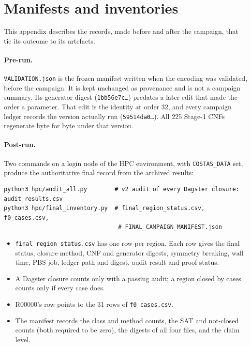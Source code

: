 \documentclass[11pt,a4paper]{article}
\theoremstyle{definition}
\newcommand{\code}[1]{\texttt{#1}}
\begin{document}
\section{Manifests and inventories}\label{app:manifests}
This appendix describes the records, made before and after the campaign, that tie its outcome to its artefacts.


\paragraph{Pre-run.} \code{VALIDATION.json} is the frozen manifest written when the encoding was
validated, before the campaign. It is kept unchanged as provenance and is not a campaign summary.
Its generator digest (\code{1bb56e7c\ldots}) predates a later edit that made the order a
parameter. That edit is the identity at order 32, and every campaign ledger records the version
actually run (\code{59514da0\ldots}). All 225 Stage-1 CNFs regenerate byte for byte under that
version.

\paragraph{Post-run.} Two commands on a login node of the HPC environment, with \code{COSTAS\_DATA} set, produce the
authoritative final record from the archived results:
{\footnotesize
\begin{verbatim}
python3 hpc/audit_all.py        # v2 audit of every Dagster closure: audit_results.csv
python3 hpc/final_inventory.py  # final_region_status.csv, f0_cases.csv,
                                 # FINAL_CAMPAIGN_MANIFEST.json
\end{verbatim}}
\begin{itemize}
\item \code{final\_region\_status.csv} has one row per region. Each row gives the final status,
closure method, CNF and generator digests, symmetry breaking, wall time, PBS job, ledger path and
digest, audit result and proof status.
\item A Dagster closure counts only with a passing audit; a region closed by cases counts only if
every case does.
\item R00000's row points to the 31 rows of \code{f0\_cases.csv}.
\item The manifest records the class and method counts, the SAT and not-closed counts (both
required to be zero), the digests of all four files, and the claim level.
\end{itemize}
\end{document}
